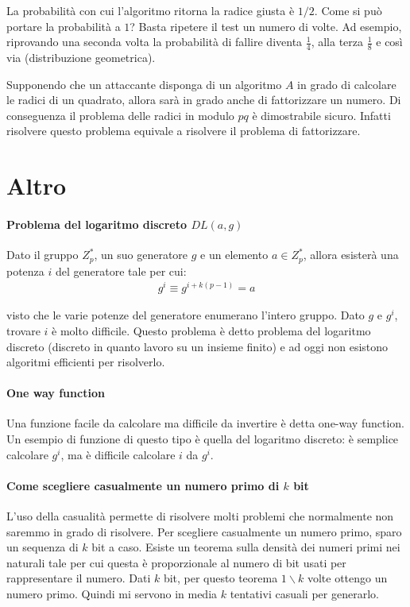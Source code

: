 La probabilità con cui l'algoritmo ritorna la radice giusta è $1 / 2$. Come si può portare la probabilità a $1$? Basta ripetere il test un  numero di volte. Ad esempio, riprovando una seconda volta la probabilità di fallire diventa $\frac{1}{4}$, alla terza $\frac{1}{8}$ e così via (distribuzione geometrica). 

Supponendo che un attaccante disponga di un algoritmo $A$ in grado di calcolare le radici di un quadrato, allora sarà in grado anche di fattorizzare un numero. Di conseguenza il problema delle radici in modulo $pq$ è dimostrabile sicuro. Infatti risolvere questo problema equivale a risolvere il problema di fattorizzare.

\section{Altro}

\paragraph{Problema del logaritmo discreto $DL(a, g)$} Dato il gruppo $Z^*_p$, un suo generatore $g$ e un elemento $a\in Z^*_p$, allora esisterà una potenza $i$ del generatore tale per cui:
\begin{align*}
    g^i \equiv g^{i + k(p-1)} = a
\end{align*}

\noindent visto che le varie potenze del generatore enumerano l'intero gruppo. Dato $g$ e $g^i$, trovare $i$ è molto difficile. Questo problema è detto problema del logaritmo discreto (discreto in quanto lavoro su un insieme finito) e ad oggi non esistono algoritmi efficienti per risolverlo.

\paragraph{One way function} Una funzione facile da calcolare ma difficile da invertire è detta one-way function. Un esempio di funzione di questo tipo è quella del logaritmo discreto: è semplice calcolare $g^i$, ma è difficile calcolare $i$ da $g^i$.

\paragraph{Come scegliere casualmente un numero primo di $k$ bit} L'uso della casualità permette di risolvere molti problemi che normalmente non saremmo in grado di risolvere. Per scegliere casualmente un numero primo, sparo un sequenza di $k$ bit a caso. Esiste un teorema sulla densità dei numeri primi nei naturali tale per cui questa è proporzionale al numero di bit usati per rappresentare il numero. Dati $k$ bit, per questo teorema $1 \backslash k$ volte ottengo un numero primo. Quindi mi servono in media $k$ tentativi casuali per generarlo. 

